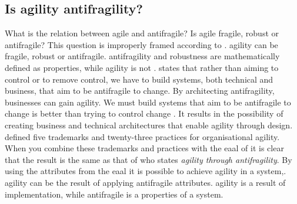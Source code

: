 \subsection{Is agility antifragility?}
\label{tb:antifragile_vs_agility}
What is the relation between \gls{agile} and \gls{antifragile}? Is \gls{agile} \gls{fragile}, \gls{robust} or \gls{antifragile}? This question is improperly framed according to \textcite[p.~6]{Tomov2019}. \Gls{agility} can be \gls{fragile}, \gls{robust} or \gls{antifragile}. \Gls{antifragility} and \gls{robustness} are mathematically defined as properties, while \gls{agility} is not \parencite[p.~6]{Tomov2019}. \textcite[Abstract]{OReilly2019} states that rather than aiming to control or to remove control, we have to build systems, both technical and business, that aim to be \gls{antifragile} to change. By architecting \gls{antifragility}, businesses can gain \gls{agility}. We must build systems that aim to be \gls{antifragile} to change is better than trying to control change \textcite[abstract]{OReilly2019}. It results in the possibility of creating business and technical architectures that enable \gls{agility} through design. \textcite[p.~7]{Aghina2018} defined five trademarks and twenty-three practices for organisational \gls{agility}. When you combine these trademarks and practices with the \acrlong{eaal} of \textcite[p.~69]{Botjes2020} it is clear that the result is the same as that of \textcite[Abstract]{OReilly2019} who states \textit{\Gls{agility} through \Gls{antifragility}}. By using the attributes from the \acrlong{eaal} it is possible to achieve \gls{agility} in a system,. \Gls{agility} can be the result of applying \gls{antifragile} \glspl{attribute}. \Gls{agility} is a result of implementation, while \gls{antifragile} is a properties of a system.
